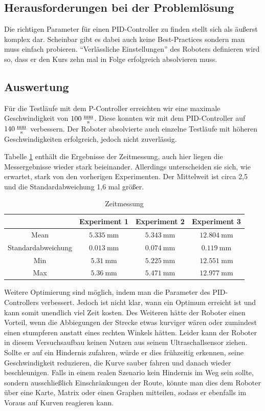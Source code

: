\documentclass[ngerman]{tudscrreprt}
\begin{document}
\subsection{Herausforderungen bei der Problemlösung}
Die richtigen Parameter für einen PID-Controller zu finden stellt sich als äußerst
komplex dar. Scheinbar gibt es dabei auch keine Best-Practices sondern man muss einfach
probieren. \enquote{Verlässliche Einstellungen} des Roboters definieren wird so, dass er
den Kurs zehn mal in Folge erfolgreich absolvieren muss.

\subsection{Auswertung}
Für die Testläufe mit dem P-Controller erreichten wir eine maximale Geschwindigkeit
von $\SI{100}{\frac{\mm}{\s}}$. Diese konnten wir mit dem PID-Controller auf
$\SI{140}{\frac{\mm}{\s}}$ verbessern. Der Roboter absolvierte auch einzelne Testläufe
mit höheren Geschwindigkeiten erfolgreich, jedoch nicht zuverlässig.

Tabelle \ref{table:zeitmessung3} enthält die Ergebnisse der Zeitmessung, auch hier
liegen die Messergebnisse wieder stark beieinander. Allerdings unterscheiden sie sich,
wie erwartet, stark von den vorherigen Experimenten. Der Mittelweit ist circa 2,5 und die
Standardabweichung 1,6 mal größer.
%
\begin{table}[H]
    \centering
    \begin{tabular}{|c|c|c|c|}
    \hline
                       & Experiment 1      & Experiment 2      & Experiment 3       \\ \hline
    Mean               & $\SI{5,335}{\mm}$ & $\SI{5,343}{\mm}$ & $\SI{12,804}{\mm}$ \\ \hline
    Standardabweichung & $\SI{0,013}{\mm}$ & $\SI{0,074}{\mm}$ & $\SI{0,119}{\mm}$  \\ \hline
    Min                & $\SI{5,31}{\mm}$  & $\SI{5,225}{\mm}$ & $\SI{12,551}{\mm}$ \\ \hline
    Max                & $\SI{5,36}{\mm}$  & $\SI{5,471}{\mm}$ & $\SI{12,977}{\mm}$ \\ \hline
    \end{tabular}
    \caption{Zeitmessung}
    \label{table:zeitmessung3}
\end{table}
%
Weitere Optimierung sind möglich, indem man die Parameter des PID-Controllers verbessert.
Jedoch ist nicht klar, wann ein Optimum erreicht ist und kann somit unendlich viel Zeit
kosten. Des Weiteren hätte der Roboter einen Vorteil, wenn die Abbiegungen der Strecke
etwas kurviger wären oder zumindest einen stumpferen anstatt eines rechten Winkels
hätten. Leider kann der Roboter in diesem Versuchsaufbau keinen Nutzen aus seinem
Ultraschallsensor ziehen. Sollte er auf ein Hindernis zufahren, würde er dies frühzeitig
erkennen, seine Geschwindigkeit reduzieren, die Kurve sauber fahren und danach wieder
beschleunigen. Falls in einem realen Szenario kein Hindernis im Weg sein sollte, sondern
ausschließlich Einschränkungen der Route, könnte man dies dem Roboter über eine Karte,
Matrix oder einen Graphen mitteilen, sodass er ebenfalls im Voraus auf Kurven reagieren
kann.
\end{document}
